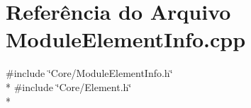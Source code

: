 \section{Referência do Arquivo Module\+Element\+Info.\+cpp}
\label{_module_element_info_8cpp}
{\ttfamily \#include \char`\"{}Core/\+Module\+Element\+Info.\+h\char`\"{}}\\*
{\ttfamily \#include \char`\"{}Core/\+Element.\+h\char`\"{}}\\*
